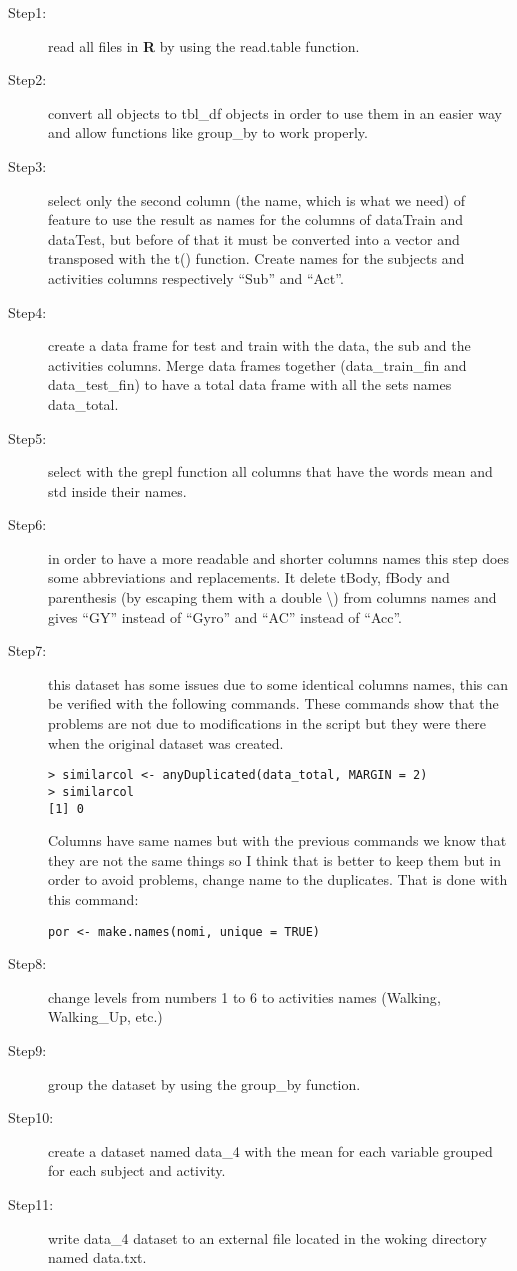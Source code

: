 \documentclass[11pt]{article}
\begin{document}
\begin{description}
\item[\textsf{Step1:}] read all files in \textsf{\bfseries R} by using the read.table function.
\item[\textsf{Step2:}] convert all objects to \textsf{tbl\_df} objects in order to use them in an easier way and allow functions like \textsf{group\_by} to work properly.
\item[\textsf{Step3:}] select only the second column (the name, which is what we need) of  feature to use the result as names for the columns of \textsf{dataTrain} and \textsf{dataTest}, but before of that it must be converted into a vector and transposed with the \textsf{t()} function.
Create names for the subjects and activities columns respectively \textsf{``Sub''} and \textsf{``Act''}.
\item[\textsf{Step4:}] create a data frame for test and train with the data, the sub and the activities columns. Merge data frames together (\textsf{data\_train\_fin} and \textsf{data\_test\_fin}) to have a total data frame with all the sets names data\_total.
\item[\textsf{Step5:}] select with the \textsf{grepl} function all columns that have the words mean and std inside their names.
\item[\textsf{Step6:}] in order to have a more readable and shorter columns names this step does some abbreviations and replacements. It delete \textsf{tBody}, \textsf{fBody} and parenthesis (by escaping them with a double \textbackslash) from columns names and gives \textsf{``GY''} instead of \textsf{``Gyro''} and \textsf{``AC''} instead of \textsf{``Acc''}.
\item[\textsf{Step7:}] this dataset has some issues due to some identical columns names, this can be verified with the following commands.
These commands show that the problems are not due to modifications in the script  but they were there when the original dataset was created.
\begin{lstlisting}
> similarcol <- anyDuplicated(data_total, MARGIN = 2)
> similarcol
[1] 0
\end{lstlisting}
Columns have same names but with the previous commands we know that they are not the same things so I think that is better to keep them but in order to avoid problems, change name to the duplicates. That is done with this command:
\begin{lstlisting}
por <- make.names(nomi, unique = TRUE)
\end{lstlisting}
\item[\textsf{Step8:}] change levels from numbers 1 to 6 to activities names (\textsf{Walking}, \textsf{Walking\_Up}, etc.)
\item[\textsf{Step9:}] group the dataset by using the \textsf{group\_by} function.
\item[\textsf{Step10:}] create a dataset named \textsf{data\_4} with the mean for each variable grouped for each subject and activity.
\item[\textsf{Step11:}] write \textsf{data\_4} dataset to an external file located in the woking directory named \textsf{data.txt}.
\end{description}
\end{document}
